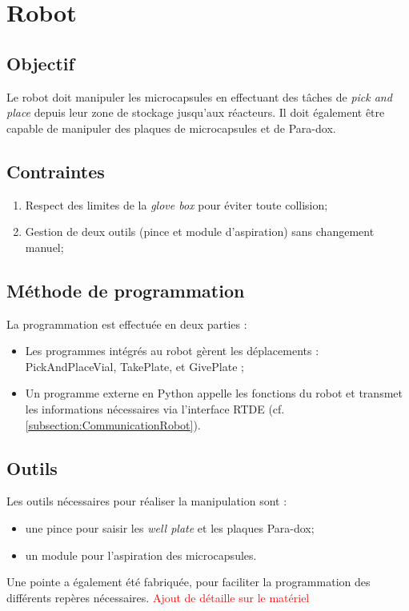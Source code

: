 \section{Robot}

\subsection{Objectif}
Le robot doit manipuler les \glspl{microcapsule} en effectuant des tâches de \textit{pick and place} depuis leur zone de stockage jusqu'aux réacteurs. Il doit également être capable de manipuler des plaques de \glspl{microcapsule} et de \og{}Para-dox\fg{}.

\subsection{Contraintes}
\begin{enumerate}
    \item Respect des limites de la \textit{glove box} pour éviter toute collision;
    \item Gestion de deux outils (pince et module d'aspiration) sans changement manuel;
\end{enumerate}

\subsection{Méthode de programmation}
La programmation est effectuée en deux parties :
\begin{itemize}
    \item Les programmes intégrés au robot gèrent les déplacements : \og{}PickAndPlaceVial\fg{}, \og{}TakePlate\fg{}, et \og{}GivePlate\fg{} ;
    \item Un programme externe en Python appelle les fonctions du robot et transmet les informations nécessaires via l'interface RTDE (cf. \autoref{subsection:CommunicationRobot}).
\end{itemize}

\subsection{Outils}
Les outils nécessaires pour réaliser la manipulation sont :
\begin{itemize}
    \item une pince pour saisir les \textit{well plate} et les plaques \og{}Para-dox\fg{};
    \item un module pour l'aspiration des \glspl{microcapsule}.
\end{itemize}
Une pointe a également été fabriquée, pour faciliter la programmation des différents repères nécessaires.
\textcolor{red}{Ajout de détaille sur le matériel}
